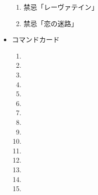 \documentclass[line_length=22zw,number_of_lines=45,twocolumn]{jlreq}
\begin{document}
\begin{itemize}
\begin{enumerate}
			\item 禁忌「レーヴァテイン」
			\item 禁忌「恋の迷路」
		\end{enumerate}
	\item コマンドカード
		\begin{enumerate}
			\item 
			\item 
			\item 
			\item 
			\item 
			\item 
			\item 
			\item 
			\item 
			\item 
			\item 
			\item 
			\item 
			\item 
			\item 
		\end{enumerate}
\end{itemize}
\pagebreak
\end{document}
